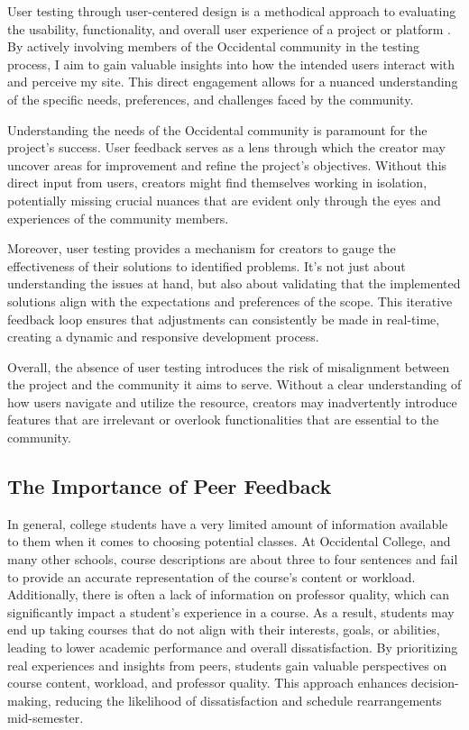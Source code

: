 \documentclass[10pt,twocolumn]{article}
\begin{document}
User testing through user-centered design is a methodical approach to evaluating the usability, functionality, and overall user experience of a project or platform \cite{mao2005}. By actively involving members of the Occidental community in the testing process, I aim to gain valuable insights into how the intended users interact with and perceive my site. This direct engagement allows for a nuanced understanding of the specific needs, preferences, and challenges faced by the community.

Understanding the needs of the Occidental community is paramount for the project's success. User feedback serves as a lens through which the creator may uncover areas for improvement and refine the project's objectives. Without this direct input from users, creators might find themselves working in isolation, potentially missing crucial nuances that are evident only through the eyes and experiences of the community members.

Moreover, user testing provides a mechanism for creators to gauge the effectiveness of their solutions to identified problems. It's not just about understanding the issues at hand, but also about validating that the implemented solutions align with the expectations and preferences of the scope. This iterative feedback loop ensures that adjustments can consistently be made in real-time, creating a dynamic and responsive development process.

Overall, the absence of user testing introduces the risk of misalignment between the project and the community it aims to serve. Without a clear understanding of how users navigate and utilize the resource, creators may inadvertently introduce features that are irrelevant or overlook functionalities that are essential to the community.

\subsection{The Importance of Peer Feedback}
In general, college students have a very limited amount of information available to them when it comes to choosing potential classes. At Occidental College, and many other schools, course descriptions are about three to four sentences and fail to provide an accurate representation of the course's content or workload. Additionally, there is often a lack of information on professor quality, which can significantly impact a student's experience in a course. As a result, students may end up taking courses that do not align with their interests, goals, or abilities, leading to lower academic performance and overall dissatisfaction.  By prioritizing real experiences and insights from peers, students gain valuable perspectives on course content, workload, and professor quality. This approach enhances decision-making, reducing the likelihood of dissatisfaction and schedule rearrangements mid-semester.
\end{document}
